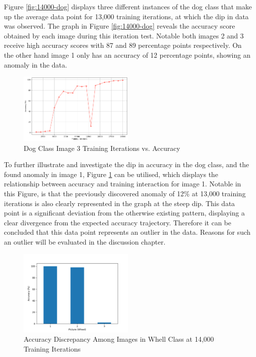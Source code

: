 Figure \ref{fig:14000-dog} displays three different instances of the dog class that make up the average data point for 13,000 training iterations, at which the dip in data was observed. The graph in Figure \ref{fig:14000-dog} reveals the accuracy score obtained by each image during this iteration test. Notable both images 2 and 3 receive high accuracy scores with 87 and 89 percentage points respectively. On the other hand image 1 only has an accuracy of 12 percentage points, showing an anomaly in the data.

\begin{figure}[h]
   \centering
   \includegraphics[width=0.5\textwidth]{../Data/dogs_image1_accuracy_vs_iteration.png}
   \caption{Dog Class Image 3 Training Iterations vs. Accuracy }
   \label{fig:image-1-accuracy}
\end{figure}

To further illustrate and investigate the dip in accuracy in the dog class, and the found anomaly in image 1,  Figure \ref{fig:image-1-accuracy} can be utilised, which displays the relationship between accuracy and training interaction for image 1. Notable in this Figure, is that the previously discovered anomaly of 12\% at 13,000 training iterations is also clearly represented in the graph at the steep dip. This data point is a significant deviation from the otherwise existing pattern, displaying a clear divergence from the expected accuracy trajectory. Therefore it can be concluded that this data point represents an outlier in the data. Reasons for such an outlier will be evaluated in the discussion chapter. 
\newpage

\begin{figure}[h]
   \centering
   \includegraphics[width=0.5\textwidth]{../Data/wheel-outliers.png}
   \caption{Accuracy Discrepancy Among Images in Whell Class at 14,000 Training Iterations}
   \label{fig:13000-wheel}
\end{figure}

